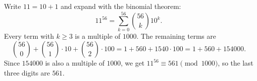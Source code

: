 Write $11=10+1$ and expand with the binomial theorem:
\[11^{56}=\sum_{k=0}^{56}\binom{56}{k}10^k .\]
Every term with $k\ge3$ is a multiple of $1000$. The remaining terms are
\[\binom{56}{0}+\binom{56}{1}\cdot10+\binom{56}{2}\cdot100=1+560+1540\cdot100=1+560+154000 .\]
Since $154000$ is also a multiple of $1000$, we get $11^{56}\equiv561\pmod{1000}$, so the last three digits are $\boxed{561}$.
